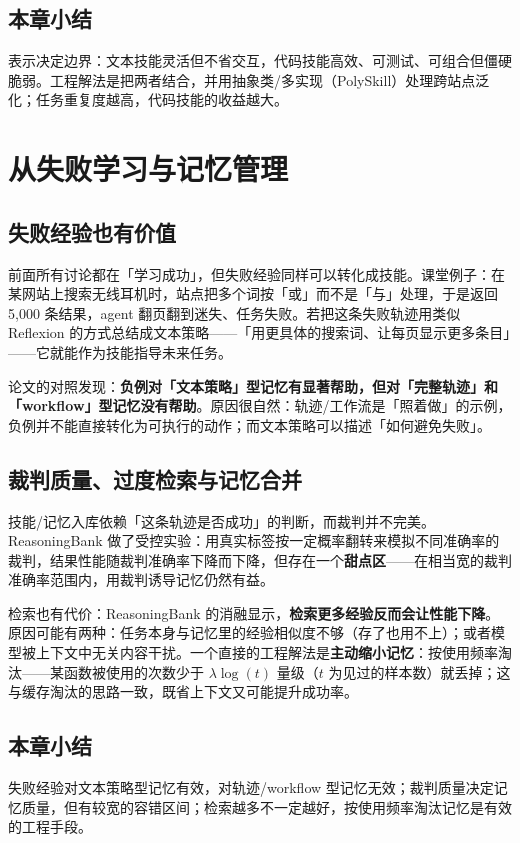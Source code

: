 ﻿\documentclass[a4paper]{article}
\begin{document}
\subsection{本章小结}
表示决定边界：文本技能灵活但不省交互，代码技能高效、可测试、可组合但僵硬脆弱。工程解法是把两者结合，并用抽象类/多实现（PolySkill）处理跨站点泛化；任务重复度越高，代码技能的收益越大。

\section{从失败学习与记忆管理}

\subsection{失败经验也有价值}

前面所有讨论都在「学习成功」，但失败经验同样可以转化成技能。课堂例子：在某网站上搜索无线耳机时，站点把多个词按「或」而不是「与」处理，于是返回 5,000 条结果，agent 翻页翻到迷失、任务失败。若把这条失败轨迹用类似 Reflexion 的方式总结成文本策略——「用更具体的搜索词、让每页显示更多条目」——它就能作为技能指导未来任务。

论文的对照发现：\textbf{负例对「文本策略」型记忆有显著帮助，但对「完整轨迹」和「workflow」型记忆没有帮助}。原因很自然：轨迹/工作流是「照着做」的示例，负例并不能直接转化为可执行的动作；而文本策略可以描述「如何避免失败」。

\subsection{裁判质量、过度检索与记忆合并}

技能/记忆入库依赖「这条轨迹是否成功」的判断，而裁判并不完美。ReasoningBank 做了受控实验：用真实标签按一定概率翻转来模拟不同准确率的裁判，结果性能随裁判准确率下降而下降，但存在一个\textbf{甜点区}——在相当宽的裁判准确率范围内，用裁判诱导记忆仍然有益。

检索也有代价：ReasoningBank 的消融显示，\textbf{检索更多经验反而会让性能下降}。原因可能有两种：任务本身与记忆里的经验相似度不够（存了也用不上）；或者模型被上下文中无关内容干扰。一个直接的工程解法是\textbf{主动缩小记忆}：按使用频率淘汰——某函数被使用的次数少于 $\lambda\log(t)$ 量级（$t$ 为见过的样本数）就丢掉；这与缓存淘汰的思路一致，既省上下文又可能提升成功率。

\subsection{本章小结}
失败经验对文本策略型记忆有效，对轨迹/workflow 型记忆无效；裁判质量决定记忆质量，但有较宽的容错区间；检索越多不一定越好，按使用频率淘汰记忆是有效的工程手段。
\end{document}
